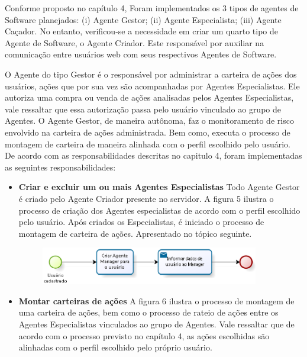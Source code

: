\begin{apendicesenv}
Conforme proposto no capítulo 4, Foram implementados os 3 tipos de agentes de Software planejados: (i) Agente Gestor; (ii) Agente Especialista; (iii) Agente Caçador. No entanto, verificou-se a necessidade em criar um quarto tipo de Agente de Software, o Agente Criador. Este responsável por auxiliar na comunicação entre usuários web com seus respectivos Agentes de Software. 


O Agente do tipo Gestor é o responsável por administrar a carteira de ações dos usuários, ações que por sua vez são acompanhadas por Agentes Especialistas. Ele autoriza uma compra ou venda de ações analisadas pelos Agentes Especialistas, vale ressaltar que essa autorização passa pelo usuário vinculado ao grupo de Agentes. O Agente Gestor, de maneira autônoma, faz o monitoramento de risco envolvido na carteira de ações administrada. Bem como, executa o processo de montagem de carteira de maneira alinhada com o perfil escolhido pelo usuário. De acordo com as responsabilidades descritas no capitulo 4, foram implementadas as seguintes responsabilidades: 

\begin{itemize}

	\item \textbf{Criar e excluir um ou mais Agentes Especialistas}\newline\newline
	Todo Agente Gestor é criado pelo Agente Criador presente no servidor. A figura 5 ilustra o processo de criação dos Agentes especialistas de acordo com o perfil escolhido pelo usuário. Após criados os Especialistas, é iniciado o processo de montagem de carteira de ações. Apresentado no tópico seguinte.
\begin{figure}[h]
\centering
\label{f5}
\includegraphics[width=0.9\textwidth]{figuras/f29}

\end{figure}

	\item \textbf{Montar carteiras de ações}\newline\newline
	A figura 6 ilustra o processo de montagem de uma carteira de ações, bem como o processo de rateio de ações entre os Agentes Especialistas vinculados ao grupo de Agentes. Vale ressaltar que de acordo com o processo previsto no capítulo 4, as ações escolhidas são alinhadas com o perfil escolhido pelo próprio usuário.  \newline
	

\end{itemize}
\end{apendicesenv}
